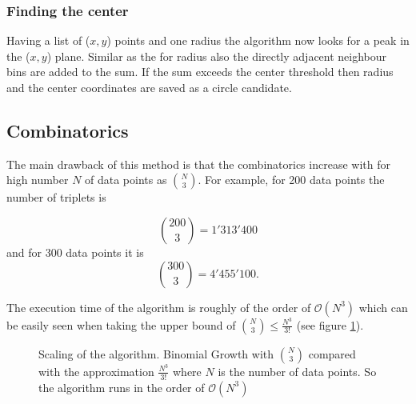 \documentclass[11pt]{scrreprt}
\begin{document}
\subsubsection{Finding the center} %
\label{ssub:finding_the_center}
Having a list of ($x,y$) points and one radius the algorithm now looks for a peak in the ($x,y$) plane. Similar as the for radius also
the directly adjacent neighbour bins are added to the sum. If the sum exceeds the center threshold then radius and the center coordinates are 
saved as a circle candidate.


\subsection{Combinatorics}
	

The main drawback of this method is that the combinatorics increase with for high number $N$ of data points as \( \binom{N}{3} \). 
For example, for 200 data points the number of triplets is

\[ \binom{200}{3} = 1'313'400 \]
and for 300 data points it is
\[ \binom{300}{3} = 4'455'100. \]

The execution time of the algorithm is roughly of the order of $\mathcal{O}(N^3)$ which can be easily seen when taking the upper bound of $\binom{N}{3} \leq \frac{N^3}{3!}$ (see figure \ref{fig:binom_growth}). 
\begin{figure}[ht]
\centering
    \caption[Complexity of the combinatorial triplet Hough transform]{Scaling of the algorithm. Binomial Growth with $\binom{N}{3}$ compared with the approximation $\frac{N^3}{3!}$ where $N$ is the number of data points. So the algorithm runs in the order of $\mathcal{O}(N^3)$}
  \label{fig:binom_growth}
\end{figure}
\end{document}
